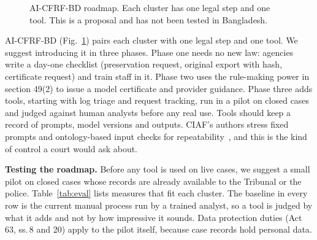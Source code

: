 \documentclass[conference]{IEEEtran}
\begin{document}
\begin{figure}[t]
\centering
{}
\caption{AI-CFRF-BD roadmap. Each cluster has one legal step and one tool. This is a proposal and has not been tested in Bangladesh.}
\label{fig:framework}
\end{figure}

AI-CFRF-BD (Fig.~\ref{fig:framework}) pairs each cluster with one legal step and one tool. We suggest introducing it in three phases. Phase one needs no new law: agencies write a day-one checklist (preservation request, original export with hash, certificate request) and train staff in it. Phase two uses the rule-making power in section 49(2) to issue a model certificate and provider guidance. Phase three adds tools, starting with log triage and request tracking, run in a pilot on closed cases and judged against human analysts before any real use. Tools should keep a record of prompts, model versions and outputs. CIAF's authors stress fixed prompts and ontology-based input checks for repeatability~\cite{ciaf}, and this is the kind of control a court would ask about.

\textbf{Testing the roadmap.} Before any tool is used on live cases, we suggest a small pilot on closed cases whose records are already available to the Tribunal or the police. Table~\ref{tab:eval} lists measures that fit each cluster. The baseline in every row is the current manual process run by a trained analyst, so a tool is judged by what it adds and not by how impressive it sounds. Data protection duties (Act 63, ss.\,8 and 20) apply to the pilot itself, because case records hold personal data.
\end{document}
